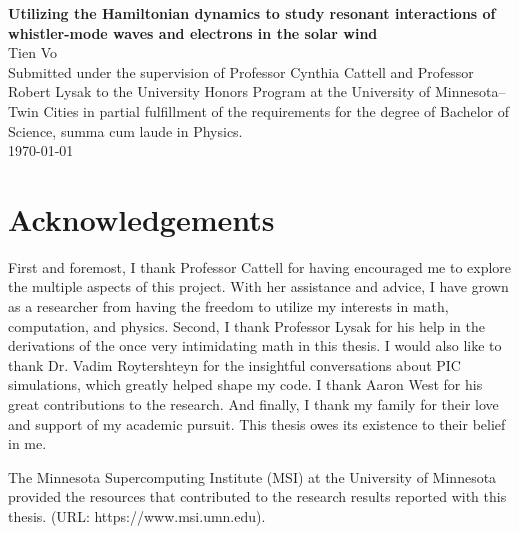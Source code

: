 \documentclass[12pt]{article}
\begin{document}


\begin{titlepage}
\begin{center}

\Large{\textbf{Utilizing the Hamiltonian dynamics to study resonant interactions
of whistler-mode waves and electrons in the solar wind}} \\
\vspace{2.5cm}
\large{Tien Vo} \\
\vspace{2.5cm}
Submitted under the supervision of Professor Cynthia Cattell and Professor
Robert Lysak to the University Honors Program at the University of
Minnesota--Twin Cities in partial fulfillment of the requirements for the degree
of Bachelor of Science, summa cum laude in Physics. \\
\vspace{2.5cm}
\today

\end{center}
\end{titlepage}

\newpage
\section*{Acknowledgements}

First and foremost, I thank Professor Cattell for having encouraged me to
explore the multiple aspects of this project. With her assistance and advice, I
have grown as a researcher from having the freedom to utilize my interests in
math, computation, and physics. Second, I thank Professor Lysak for his help in
the derivations of the once very intimidating math in this thesis. I
would also like to thank Dr. Vadim Roytershteyn for the insightful
conversations about PIC simulations, which greatly helped shape my code.
I thank Aaron West for his great contributions to the research. And finally, I thank my family for their love and support of my academic pursuit. This thesis owes its existence to their belief in me.

The Minnesota Supercomputing Institute (MSI) at the University of Minnesota
provided the resources that contributed to the research results reported with
this thesis. (URL: https://www.msi.umn.edu).
\end{document}
